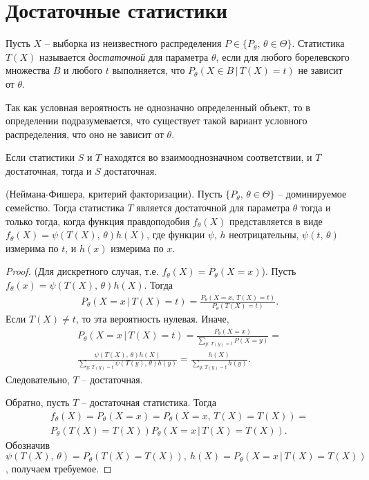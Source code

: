 \section{Достаточные статистики}
\begin{definition}
    Пусть $X$ -- выборка из неизвестного распределения $P \in \{P_\theta,\, \theta \in \Theta\}$. Статистика $T(X)$ называется \textit{достаточной} для параметра $\theta$, если для любого борелевского множества $B$ и любого $t$ выполняется, что $P_\theta(X \in B\, \vert\, T(X) = t)$ не зависит от $\theta$.
\end{definition}
\begin{note}
    Так как условная вероятность не однозначно определенный объект, то в определении подразумевается, что существует такой вариант условного распределения, что оно не зависит от $\theta$.
\end{note}
\begin{note}
    Если статистики $S$ и $T$ находятся во взаимооднозначном соответствии, и $T$ достаточная, тогда и $S$ достаточная.
\end{note}
\begin{theorem} 
    (Неймана-Фишера, критерий факторизации). Пусть $\{P_\theta,\, \theta \in \Theta\}$ -- доминируемое семейство. Тогда статистика $T$ является достаточной для параметра $\theta$ тогда и только тогда, когда функция правдоподобия $f_\theta(X)$ представляется в виде $f_\theta(X) = \psi(T(X),\, \theta)h(X)$, где функции $\psi,\, h$ неотрицательны, $\psi(t,\, \theta)$ измерима по $t$, и $h(x)$ измерима по $x$.
\end{theorem}
\begin{proof}
    (Для дискретного случая, т.е. $f_\theta(X) = P_\theta(X = x)$). Пусть $f_\theta(x) = \psi(T(X),\, \theta)h(X)$. Тогда 
    \begin{gather*}
        P_\theta(X = x\, \vert\, T(X) = t) = \frac{P_\theta(X = x,\, T(X) = t)}{P_\theta(T(X) = t)}.
    \end{gather*}
    Если $T(X) \ne t$, то эта вероятность нулевая. Иначе,
    \begin{gather*}
        P_\theta(X = x\, \vert\, T(X) = t) = \frac{P_\theta (X = x)}{\sum_{y:\, T(y) = t}P(X = y)} =\\ \frac{\psi(T(X),\, \theta)h(X)}{\sum_{y:\, T(y) = t}\psi(T(y),\, \theta)h(y)} = \frac{h(X)}{\sum_{y:\, T(y) = t}h(y)}.
    \end{gather*}
    Следовательно, $T$ -- достаточная.
    
    Обратно, пусть $T$ -- достаточная статистика. Тогда
    \begin{gather*}
        f_\theta(X)=P_\theta(X = x) = P_\theta(X = x,\, T(X) = T(X)) =\\ P_\theta(T(X) = T(X))P_\theta(X = x\, \vert\, T(X) = T(X)).
    \end{gather*}
    Обозначив $\psi(T(X),\, \theta) = P_\theta(T(X) = T(X)),\ h(X) = P_\theta(X = x\, \vert\, T(X) = T(X))$, получаем требуемое.
\end{proof}

